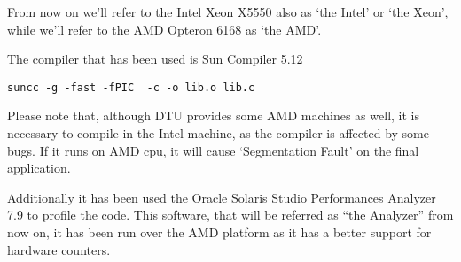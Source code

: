 From now on we’ll refer to the Intel Xeon X5550 also as ‘the Intel’ or ‘the Xeon’, while we’ll refer to the AMD Opteron 6168 as ‘the AMD’.


The compiler that has been used is Sun Compiler 5.12 

\begin{lstlisting}
suncc -g -fast -fPIC  -c -o lib.o lib.c
\end{lstlisting}

Please note that, although DTU provides some AMD machines as well, it is necessary to compile in the Intel machine, as the compiler is affected by some bugs. If it runs on AMD cpu, it will cause ‘Segmentation Fault’ on the final application.

Additionally it has been used the Oracle Solaris Studio Performances Analyzer 7.9 to profile the code. This software, that will be referred as “the Analyzer” from now on, it has been run over the AMD platform as it has a better support for hardware counters.
